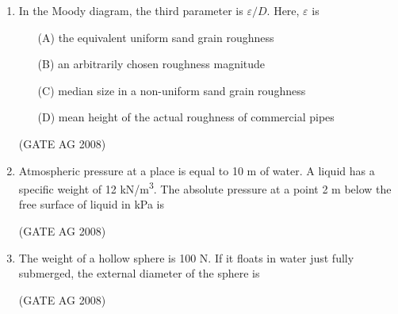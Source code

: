 \documentclass[journal,12pt,onecolumn]{IEEEtran}
\begin{document}
\begin{enumerate}
\medskip

\item 
 In the Moody diagram, the third parameter is $\varepsilon/D$. Here, $\varepsilon$ is
\begin{enumerate}
\item[(A)] the equivalent uniform sand grain roughness
\item[(B)] an arbitrarily chosen roughness magnitude
\item[(C)] median size in a non-uniform sand grain roughness
\item[(D)] mean height of the actual roughness of commercial pipes
\end{enumerate}
\hfill(GATE AG 2008)\\

\medskip

\item 
 Atmospheric pressure at a place is equal to 10 m of water. A liquid has a specific weight of 12 kN/m\textsuperscript{3}. The absolute pressure at a point 2 m below the free surface of liquid in kPa is
\begin{enumerate}
\end{enumerate}
\hfill(GATE AG 2008)\\

\medskip

\item 
 The weight of a hollow sphere is 100 N. If it floats in water just fully submerged, the external diameter of the sphere is
\begin{enumerate}
\end{enumerate}
\hfill(GATE AG 2008)\\

\medskip


\end{enumerate}
\end{document}
